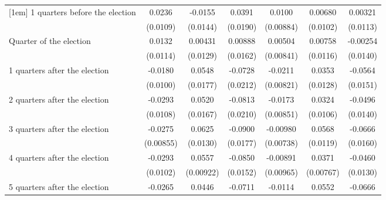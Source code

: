 \begin{table}[!ht]
\begin{tabular}{l*{6}{c}}
[1em]
 1 quarters before the election&      0.0236\sym{*}  &     -0.0155         &      0.0391\sym{*}  &      0.0100         &     0.00680         &     0.00321         \\
                    &    (0.0109)         &    (0.0144)         &    (0.0190)         &   (0.00884)         &    (0.0102)         &    (0.0113)         \\
[1em]
Quarter of the election&      0.0132         &     0.00431         &     0.00888         &     0.00504         &     0.00758         &    -0.00254         \\
                    &    (0.0114)         &    (0.0129)         &    (0.0162)         &   (0.00841)         &    (0.0116)         &    (0.0140)         \\
[1em]
 1 quarters after the election&     -0.0180         &      0.0548\sym{**} &     -0.0728\sym{***}&     -0.0211\sym{*}  &      0.0353\sym{**} &     -0.0564\sym{***}\\
                    &    (0.0100)         &    (0.0177)         &    (0.0212)         &   (0.00821)         &    (0.0128)         &    (0.0151)         \\
[1em]
 2 quarters after the election&     -0.0293\sym{**} &      0.0520\sym{**} &     -0.0813\sym{***}&     -0.0173\sym{*}  &      0.0324\sym{**} &     -0.0496\sym{***}\\
                    &    (0.0108)         &    (0.0167)         &    (0.0210)         &   (0.00851)         &    (0.0106)         &    (0.0140)         \\
[1em]
 3 quarters after the election&     -0.0275\sym{**} &      0.0625\sym{***}&     -0.0900\sym{***}&    -0.00980         &      0.0568\sym{***}&     -0.0666\sym{***}\\
                    &   (0.00855)         &    (0.0130)         &    (0.0177)         &   (0.00738)         &    (0.0119)         &    (0.0160)         \\
[1em]
 4 quarters after the election&     -0.0293\sym{**} &      0.0557\sym{***}&     -0.0850\sym{***}&    -0.00891         &      0.0371\sym{***}&     -0.0460\sym{***}\\
                    &    (0.0102)         &   (0.00922)         &    (0.0152)         &   (0.00965)         &   (0.00767)         &    (0.0130)         \\
[1em]
 5 quarters after the election&     -0.0265\sym{*}  &      0.0446\sym{**} &     -0.0711\sym{***}&     -0.0114         &      0.0552\sym{***}&     -0.0666\sym{***}\\

\end{tabular}
\end{table}
